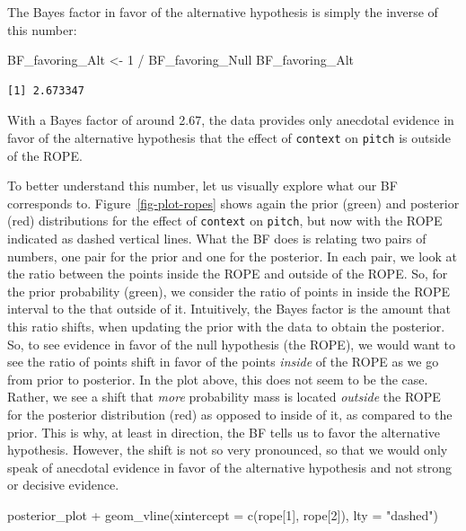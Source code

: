 \documentclass[
  doc,
  floatsintext,
  longtable,
  nolmodern,
  notxfonts,
  notimes,
  colorlinks=true,linkcolor=blue,citecolor=blue,urlcolor=blue]{apa7}
\newenvironment{Shaded}{\begin{snugshade}}{\end{snugshade}}
\newcommand{\AttributeTok}[1]{\textcolor[rgb]{0.40,0.45,0.13}{#1}}
\newcommand{\DecValTok}[1]{\textcolor[rgb]{0.68,0.00,0.00}{#1}}
\newcommand{\FunctionTok}[1]{\textcolor[rgb]{0.28,0.35,0.67}{#1}}
\newcommand{\NormalTok}[1]{\textcolor[rgb]{0.00,0.23,0.31}{#1}}
\newcommand{\OtherTok}[1]{\textcolor[rgb]{0.00,0.23,0.31}{#1}}
\newcommand{\SpecialCharTok}[1]{\textcolor[rgb]{0.37,0.37,0.37}{#1}}
\newcommand{\StringTok}[1]{\textcolor[rgb]{0.13,0.47,0.30}{#1}}
\begin{document}
The Bayes factor in favor of the alternative hypothesis is simply the
inverse of this number:

\begin{Shaded}
\begin{Highlighting}[]
\NormalTok{BF\_favoring\_Alt }\OtherTok{\textless{}{-}} \DecValTok{1} \SpecialCharTok{/}\NormalTok{ BF\_favoring\_Null}
\NormalTok{BF\_favoring\_Alt}
\end{Highlighting}
\end{Shaded}

\begin{verbatim}
[1] 2.673347
\end{verbatim}

With a Bayes factor of around 2.67, the data provides only anecdotal
evidence in favor of the alternative hypothesis that the effect of
\texttt{context} on \texttt{pitch} is outside of the ROPE.

To better understand this number, let us visually explore what our BF
corresponds to. Figure~\ref{fig-plot-ropes} shows again the prior
(green) and posterior (red) distributions for the effect of
\texttt{context} on \texttt{pitch}, but now with the ROPE indicated as
dashed vertical lines. What the BF does is relating two pairs of
numbers, one pair for the prior and one for the posterior. In each pair,
we look at the ratio between the points inside the ROPE and outside of
the ROPE. So, for the prior probability (green), we consider the ratio
of points in inside the ROPE interval to the that outside of it.
Intuitively, the Bayes factor is the amount that this ratio shifts, when
updating the prior with the data to obtain the posterior. So, to see
evidence in favor of the null hypothesis (the ROPE), we would want to
see the ratio of points shift in favor of the points \emph{inside} of
the ROPE as we go from prior to posterior. In the plot above, this does
not seem to be the case. Rather, we see a shift that \emph{more}
probability mass is located \emph{outside} the ROPE for the posterior
distribution (red) as opposed to inside of it, as compared to the prior.
This is why, at least in direction, the BF tells us to favor the
alternative hypothesis. However, the shift is not so very pronounced, so
that we would only speak of anecdotal evidence in favor of the
alternative hypothesis and not strong or decisive evidence.

\begin{Shaded}
\begin{Highlighting}[]
\NormalTok{posterior\_plot }\SpecialCharTok{+} 
  \FunctionTok{geom\_vline}\NormalTok{(}\AttributeTok{xintercept =} \FunctionTok{c}\NormalTok{(rope[}\DecValTok{1}\NormalTok{], rope[}\DecValTok{2}\NormalTok{]),}
             \AttributeTok{lty =} \StringTok{"dashed"}\NormalTok{)}
\end{Highlighting}
\end{Shaded}
\end{document}
